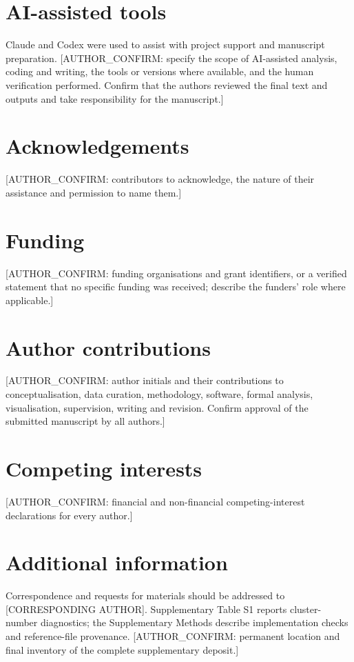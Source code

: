 \documentclass[11pt,a4paper]{article}
\begin{document}
\section*{AI-assisted tools}
Claude and Codex were used to assist with project support and manuscript preparation. [AUTHOR\_CONFIRM: specify the scope of AI-assisted analysis, coding and writing, the tools or versions where available, and the human verification performed. Confirm that the authors reviewed the final text and outputs and take responsibility for the manuscript.]

\section*{Acknowledgements}
[AUTHOR\_CONFIRM: contributors to acknowledge, the nature of their assistance and permission to name them.]

\section*{Funding}
[AUTHOR\_CONFIRM: funding organisations and grant identifiers, or a verified statement that no specific funding was received; describe the funders' role where applicable.]

\section*{Author contributions}
[AUTHOR\_CONFIRM: author initials and their contributions to conceptualisation, data curation, methodology, software, formal analysis, visualisation, supervision, writing and revision. Confirm approval of the submitted manuscript by all authors.]

\section*{Competing interests}
[AUTHOR\_CONFIRM: financial and non-financial competing-interest declarations for every author.]

\section*{Additional information}
Correspondence and requests for materials should be addressed to [CORRESPONDING AUTHOR]. Supplementary Table S1 reports cluster-number diagnostics; the Supplementary Methods describe implementation checks and reference-file provenance. [AUTHOR\_CONFIRM: permanent location and final inventory of the complete supplementary deposit.]
\end{document}
